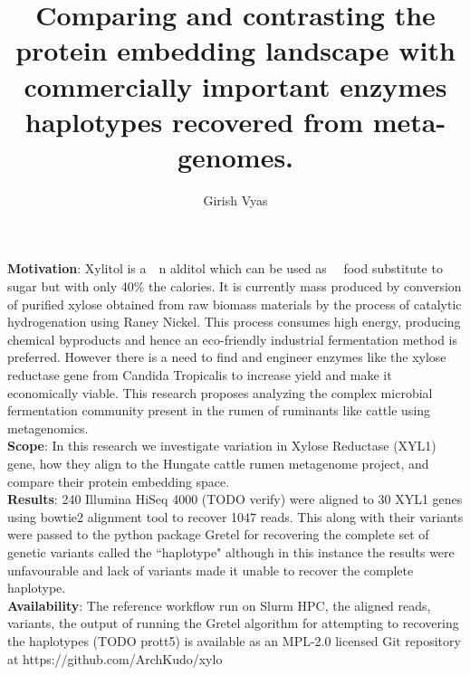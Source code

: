 \documentclass{main}
\title{Comparing and contrasting the protein embedding landscape with commercially important enzymes haplotypes recovered from meta-genomes.}    %
\author{Girish Vyas}                      %
\begin{document}
\setlength{\parindent}{0pt}

\onehalfspacing

\begin{singlespace}

  \beforepreface







  \countem

  \textbf{Motivation}: Xylitol is a~~n alditol which can be used as~~ food substitute to sugar but with only 40\% the calories. It is currently mass produced by conversion of purified xylose obtained from raw biomass materials by the process of catalytic hydrogenation using Raney Nickel. This process consumes high energy, producing chemical byproducts and hence an eco-friendly industrial fermentation method is preferred. However there is a need to find and engineer enzymes like the xylose reductase gene from Candida Tropicalis to increase yield and make it economically viable. This research proposes analyzing the complex microbial fermentation community present in the rumen of ruminants like cattle using metagenomics.\\
  \textbf{Scope}: In this research we investigate variation in Xylose Reductase (XYL1) gene, how they align to the Hungate cattle rumen metagenome project, and compare their protein embedding space.\\
  \textbf{Results}: 240 Illumina HiSeq 4000 (TODO verify) were aligned to 30 XYL1 genes using bowtie2 alignment tool to recover 1047 reads. This along with their variants were passed to the python package Gretel for recovering the complete set of genetic variants called the ``haplotype" although in this instance the results were unfavourable and lack of variants made it unable to recover the complete haplotype.\\
  \textbf{Availability}: The reference workflow run on Slurm HPC, the aligned reads, variants, the output of running the Gretel algorithm for attempting to recovering the haplotypes (TODO prott5) is available as an MPL-2.0 licensed Git repository at https://github.com/ArchKudo/xylo


\end{singlespace}
\end{document}
